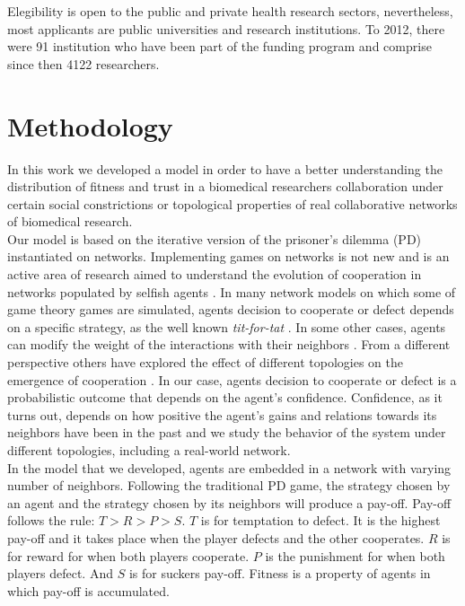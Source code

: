 Elegibility is open to the public and private health research
sectors, nevertheless, most applicants are public universities and
research institutions. To 2012, there were 91 institution who have
been part of the funding program and comprise since then 4122
researchers.

\section{Methodology}
\label{sec:2}
In this work we developed a model in order to have a better
understanding the distribution of fitness and trust in a biomedical
researchers collaboration under certain social constrictions or
topological properties of real collaborative networks of biomedical
research.\\

Our model is based on the iterative version of the prisoner's dilemma (PD)
instantiated on networks. Implementing games on networks is not new
and is an active area of research aimed to understand the evolution of
cooperation in networks populated by selfish agents
\cite{Szabo2007,Nowak1992,Nowak2006}. In many network models on which some of game
theory games are simulated, agents decision to cooperate or defect
depends on a specific strategy, as the well known \textit{tit-for-tat}
\cite{Axelrod2006,Nowak2011}. In some other cases, agents can modify the weight
of the interactions with their neighbors \cite{Santos2006}. From a different perspective
others have explored the effect of different topologies on the
emergence of cooperation \cite{Santos2005,Hauert2004}. In our case, agents decision
to cooperate or defect is a probabilistic outcome that depends on the
agent's confidence. Confidence, as it turns out, depends on how
positive the agent's gains and relations towards its neighbors
have been in the past and we study the behavior of the system under
different topologies, including a real-world network.\\ 

In the model that we developed, agents are embedded in a network with
varying number of neighbors. Following the traditional PD game, the
strategy chosen by an agent and the strategy chosen by its neighbors
will produce a pay-off. Pay-off follows the rule: $T > R > P > S$. $T$
is for temptation to defect. It is the highest pay-off and it takes
place when the player defects and the other cooperates. $R$ is for
reward for when both players cooperate. $P$ is the punishment for when
both players defect. And $S$ is for suckers pay-off. Fitness is a
property of agents in which pay-off is accumulated.\\ 

